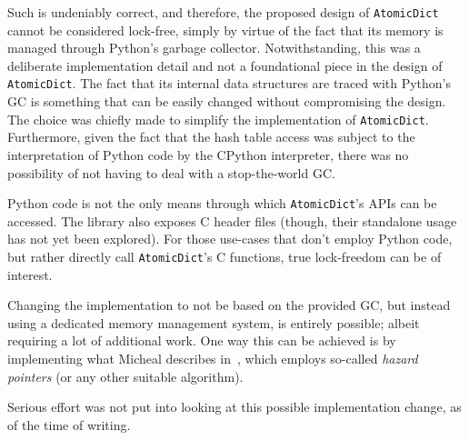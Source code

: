 Such is undeniably correct, and therefore, the proposed design of \texttt{AtomicDict} cannot be considered lock-free, simply by virtue of the fact that its memory is managed through Python's garbage collector.
Notwithstanding, this was a deliberate implementation detail and not a foundational piece in the design of \texttt{AtomicDict}.
The fact that its internal data structures are traced with Python's GC is something that can be easily changed without compromising the design.
The choice was chiefly made to simplify the implementation of \texttt{AtomicDict}.
Furthermore, given the fact that the hash table access was subject to the interpretation of Python code by the CPython interpreter, there was no possibility of not having to deal with a stop-the-world GC\@.

Python code is not the only means through which \texttt{AtomicDict}'s APIs can be accessed.
The library also exposes C header files (though, their standalone usage has not yet been explored).
For those use-cases that don't employ Python code, but rather directly call \texttt{AtomicDict}'s C functions, true lock-freedom can be of interest.

Changing the implementation to not be based on the provided GC, but instead using a dedicated memory management system, is entirely possible; albeit requiring a lot of additional work.
One way this can be achieved is by implementing what Micheal describes in~\cite{micheal-safe-reclamation}, which employs so-called \emph{hazard pointers} (or any other suitable algorithm).

Serious effort was not put into looking at this possible implementation change, as of the time of writing.
